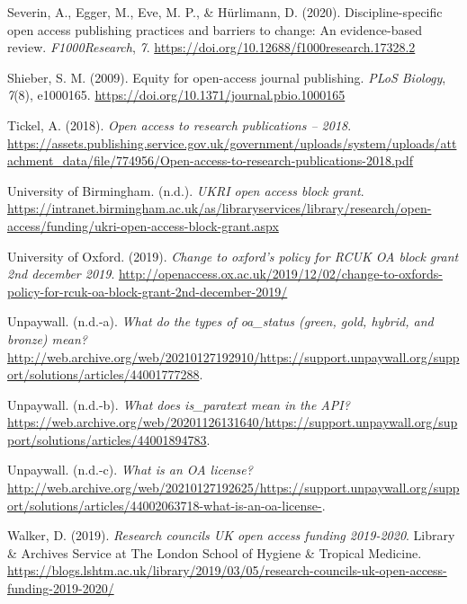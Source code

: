 \documentclass[a4paper,man,floatsintext,longtable,noextraspace,12pt]{apa6}
\newenvironment{CSLReferences}%
  {}%
  {\par}
\begin{document}
\begin{CSLReferences}{1}{0}
\leavevmode\hypertarget{ref-Severin_2020}{}%
Severin, A., Egger, M., Eve, M. P., \& Hürlimann, D. (2020).
Discipline-specific open access publishing practices and barriers to
change: An evidence-based review. \emph{F1000Research}, \emph{7}.
\url{https://doi.org/10.12688/f1000research.17328.2}

\leavevmode\hypertarget{ref-Shieber_2009}{}%
Shieber, S. M. (2009). Equity for open-access journal publishing.
\emph{{PLoS} Biology}, \emph{7}(8), e1000165.
\url{https://doi.org/10.1371/journal.pbio.1000165}

\leavevmode\hypertarget{ref-Tickel_2018}{}%
Tickel, A. (2018). \emph{Open access to research publications -- 2018}.
\url{https://assets.publishing.service.gov.uk/government/uploads/system/uploads/attachment_data/file/774956/Open-access-to-research-publications-2018.pdf}

\leavevmode\hypertarget{ref-birmingham}{}%
University of Birmingham. (n.d.). \emph{UKRI open access block grant}.
\url{https://intranet.birmingham.ac.uk/as/libraryservices/library/research/open-access/funding/ukri-open-access-block-grant.aspx}

\leavevmode\hypertarget{ref-oxford_2019}{}%
University of Oxford. (2019). \emph{Change to oxford's policy for RCUK
OA block grant 2nd december 2019}.
\url{http://openaccess.ox.ac.uk/2019/12/02/change-to-oxfords-policy-for-rcuk-oa-block-grant-2nd-december-2019/}

\leavevmode\hypertarget{ref-Unpaywall_types}{}%
Unpaywall. (n.d.-a). \emph{{What do the types of oa\_status (green,
gold, hybrid, and bronze) mean?}}
\url{http://web.archive.org/web/20210127192910/https://support.unpaywall.org/support/solutions/articles/44001777288}.

\leavevmode\hypertarget{ref-Unpaywall_para}{}%
Unpaywall. (n.d.-b). \emph{{What does is\_paratext mean in the API?}}
\url{https://web.archive.org/web/20201126131640/https://support.unpaywall.org/support/solutions/articles/44001894783}.

\leavevmode\hypertarget{ref-Unpaywall_oa_license}{}%
Unpaywall. (n.d.-c). \emph{{What is an OA license?}}
\url{http://web.archive.org/web/20210127192625/https://support.unpaywall.org/support/solutions/articles/44002063718-what-is-an-oa-license-}.

\leavevmode\hypertarget{ref-walker_2019}{}%
Walker, D. (2019). \emph{Research councils UK open access funding
2019-2020}. Library \& Archives Service at The London School of Hygiene
\& Tropical Medicine.
\url{https://blogs.lshtm.ac.uk/library/2019/03/05/research-councils-uk-open-access-funding-2019-2020/}


\end{CSLReferences}
\end{document}
